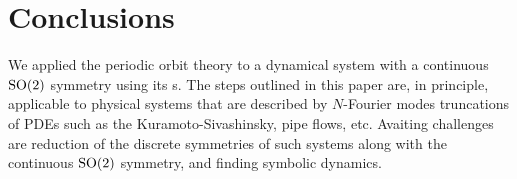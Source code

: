 \section{Conclusions}
\label{s:concl}
We applied the periodic orbit theory to a dynamical system with a continuous $\textrm{SO}(2)$ symmetry using its \rpo s. The steps outlined in this paper are, in principle, applicable to physical systems that are described by $N$-Fourier modes truncations of PDEs such as the Kuramoto-Sivashinsky, pipe flows, etc. Avaiting challenges are reduction of the discrete symmetries of such systems along with the continuous $\textrm{SO}(2)$ symmetry, and finding symbolic dynamics.
